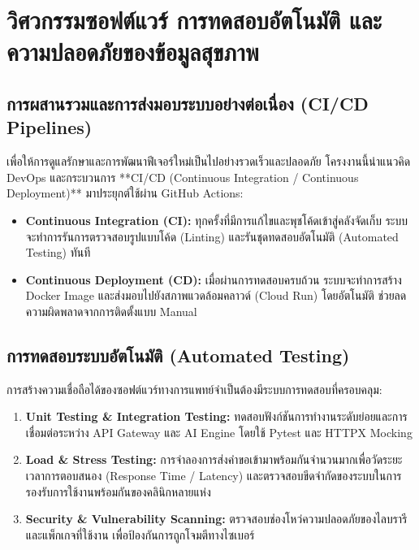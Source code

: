 \section{วิศวกรรมซอฟต์แวร์ การทดสอบอัตโนมัติ และความปลอดภัยของข้อมูลสุขภาพ}
\label{sec:software_engineering_pdpa}

\subsection{การผสานรวมและการส่งมอบระบบอย่างต่อเนื่อง (CI/CD Pipelines)}
เพื่อให้การดูแลรักษาและการพัฒนาฟีเจอร์ใหม่เป็นไปอย่างรวดเร็วและปลอดภัย โครงงานนี้นำแนวคิด DevOps และกระบวนการ **CI/CD (Continuous Integration / Continuous Deployment)** มาประยุกต์ใช้ผ่าน GitHub Actions:
\begin{itemize}
    \item \textbf{Continuous Integration (CI):} ทุกครั้งที่มีการแก้ไขและพุชโค้ดเข้าสู่คลังจัดเก็บ ระบบจะทำการรันการตรวจสอบรูปแบบโค้ด (Linting) และรันชุดทดสอบอัตโนมัติ (Automated Testing) ทันที
    \item \textbf{Continuous Deployment (CD):} เมื่อผ่านการทดสอบครบถ้วน ระบบจะทำการสร้าง Docker Image และส่งมอบไปยังสภาพแวดล้อมคลาวด์ (Cloud Run) โดยอัตโนมัติ ช่วยลดความผิดพลาดจากการติดตั้งแบบ Manual
\end{itemize}

\subsection{การทดสอบระบบอัตโนมัติ (Automated Testing)}
การสร้างความเชื่อถือได้ของซอฟต์แวร์ทางการแพทย์จำเป็นต้องมีระบบการทดสอบที่ครอบคลุม:
\begin{enumerate}
    \item \textbf{Unit Testing \& Integration Testing:} ทดสอบฟังก์ชันการทำงานระดับย่อยและการเชื่อมต่อระหว่าง API Gateway และ AI Engine โดยใช้ Pytest และ HTTPX Mocking
    \item \textbf{Load \& Stress Testing:} การจำลองการส่งคำขอเข้ามาพร้อมกันจำนวนมากเพื่อวัดระยะเวลาการตอบสนอง (Response Time / Latency) และตรวจสอบขีดจำกัดของระบบในการรองรับการใช้งานพร้อมกันของคลินิกหลายแห่ง
    \item \textbf{Security \& Vulnerability Scanning:} ตรวจสอบช่องโหว่ความปลอดภัยของไลบรารีและแพ็กเกจที่ใช้งาน เพื่อป้องกันการถูกโจมตีทางไซเบอร์
\end{enumerate}

